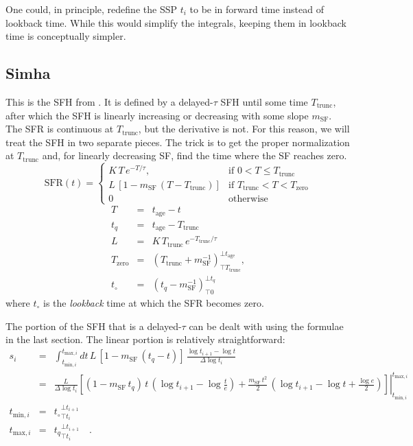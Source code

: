\documentclass[12pt, letterpaper, preprint]{aastex}
\newcommand{\tmin}[1][]{t_{\mathrm{min} #1}}
\newcommand{\tmax}[1][]{t_{\mathrm{max} #1}}
\newcommand{\dlt}{\Delta\log t_i}
\newcommand{\tintegral}{\int_{\tmin[,i]}^{\tmax[,i]} dt}
\newcommand{\tinterval}{\right|_{\tmin[,i]}^{\tmax[,i]}}
\newcommand{\clip}[3][]{{#1}_{\top {#2}}^{\bot {#3}}}
\newcommand{\sftrunc}{T_{\mathrm{trunc}}}
\newcommand{\tage}{t_{\mathrm{age}}}
\newcommand{\sfzero}{T_{\mathrm{zero}}}
\newcommand{\tzero}{t_{\circ}}
\newcommand{\sfslope}{m_{\mathrm{SF}}}
\begin{document}
One could, in principle, redefine the SSP $t_i$ to be in forward time instead of lookback time.  While this would simplify the integrals, keeping them in lookback time is conceptually simpler.

\subsection{Simha}
This is the SFH from \citet{simha14}.  
It is defined by a delayed-$\tau$ SFH until some time $\sftrunc$, after which the SFH is linearly increasing or decreasing with some slope $m_{\mathrm{SF}}$.  
The SFR is continuous at $\sftrunc$, but the derivative is not.  
For this reason, we will treat the SFH in two separate pieces.  
The trick is to get the proper normalization at $\sftrunc$ and, for linearly decreasing SF, find the time where the SF reaches zero. 
\[ 
\mathrm{SFR}(t) = 
\begin{cases}
K \, T \, e^{-T/\tau}, &  \text{if } 0 < T \leq \sftrunc \\
L\, \left[1 - \sfslope \, (T - \sftrunc)\right] & \text{if } \sftrunc < T  < \sfzero \\
0 & \text{otherwise}
\end{cases}
\]
\begin{eqnarray}
T & = & \tage - t \nonumber \\
t_q & = & \tage - \sftrunc \nonumber \\
L & = & K \, \sftrunc \, e^{-\sftrunc/\tau} \nonumber \\
\sfzero & = & \clip[\left(\sftrunc + \sfslope^{-1}\right)]{\sftrunc}{\tage}, \nonumber \\
\tzero & = & \clip[\left( t_q - \sfslope^{-1}\right)]{0}{t_q} \nonumber
\end{eqnarray}
where $\tzero$ is the \emph{lookback} time at which the SFR becomes zero.

The portion of the SFH that is a delayed-$\tau$ can be dealt with using the formulae in the last section.  The linear portion is relatively straightforward:
\begin{eqnarray}
s_i  & = & \tintegral \,  L\, \left[1 - \sfslope \, (t_q - t)\right] \, \frac{\log t_{i+1} - \log t}{\dlt}  \nonumber \\
      & = & \frac{L}{\dlt} \left.\left[(1-\sfslope\, t_q) \, t \, \left(\log t_{i+1} - \log\frac{t}{e} \right) + \frac{\sfslope \, t^2}{2} \, \left(\log t_{i+1} - \log t +\frac{\log e}{2}\right)  \right] \tinterval \\
\tmin[,i] & = & \clip[\tzero]{t_i}{t_{i+1}} \nonumber \\
\tmax[,i] & = & \clip[t_q]{t_i}{t_{i+1}} \quad . \nonumber
\end{eqnarray}
\end{document}
